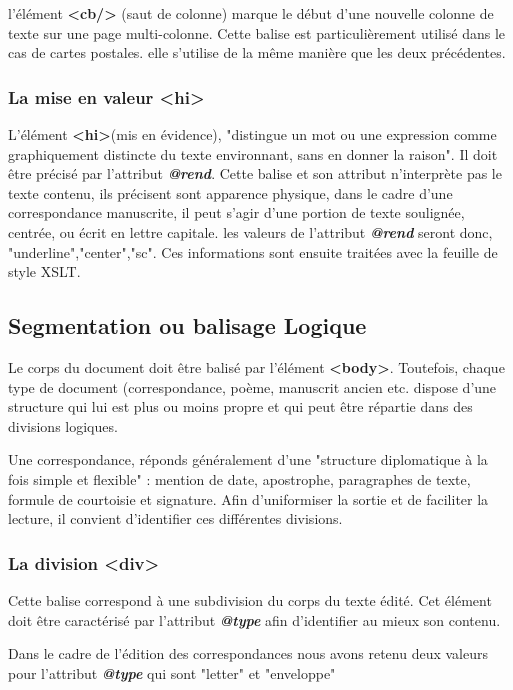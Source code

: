 \documentclass[18pt,a4paper,oneside]{book} %
\begin{document}
l'élément \textbf{<cb/>} (saut de colonne) marque le début d'une nouvelle colonne de texte sur une page multi-colonne. Cette balise est particulièrement utilisé dans le cas de cartes postales. elle s'utilise de la même manière que les deux précédentes.

\subsubsection{La mise en valeur <hi>}
L'élément \textbf{<hi>}(mis en évidence), "distingue un mot ou une expression comme graphiquement distincte du texte environnant, sans en donner la raison". Il doit être précisé par l'attribut \textbf{\textit{@rend}}.
Cette balise et son attribut n'interprète pas le texte contenu, ils précisent sont apparence physique, dans le cadre d'une correspondance manuscrite, il peut s'agir d'une portion de texte soulignée, centrée, ou écrit en lettre capitale. les valeurs de l'attribut \textit{\textbf{@rend}} seront donc, "underline","center","sc".
Ces informations sont ensuite traitées avec la feuille de style XSLT.


\subsection{Segmentation ou balisage Logique}

Le corps du document doit être balisé par l'élément \textbf{<body>}. Toutefois, chaque type de document (correspondance, poème, manuscrit ancien etc. dispose d'une structure qui lui est plus ou moins propre et qui peut être répartie dans des divisions logiques.
\bigskip 

Une correspondance, réponds généralement d'une "structure diplomatique à la fois simple et flexible" :
mention de date, apostrophe, paragraphes de texte, formule de courtoisie et signature. Afin d'uniformiser la sortie et de faciliter la lecture, il convient d'identifier ces différentes divisions.  

\subsubsection{La division <div>}

Cette balise correspond à une subdivision du corps du texte édité. Cet élément doit être caractérisé par l'attribut \textit{\textbf{@type}} afin d'identifier au mieux son contenu.
\bigskip 

Dans le cadre de l'édition des correspondances nous avons retenu deux valeurs pour l'attribut \textit{\textbf{@type}} qui sont "letter" et "enveloppe"
\bigskip 
\end{document}
